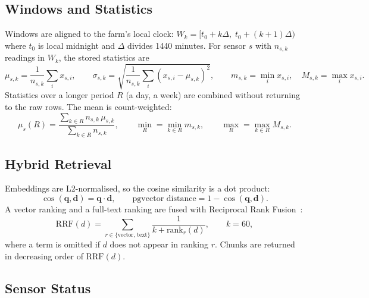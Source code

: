 \subsection{Windows and Statistics}

Windows are aligned to the farm's local clock: $W_k=[t_0+k\Delta,\;t_0+(k+1)\Delta)$ where $t_0$ is local midnight and $\Delta$ divides
1440 minutes. For sensor $s$ with $n_{s,k}$ readings in $W_k$, the stored statistics are
\begin{equation}
\mu_{s,k}=\frac{1}{n_{s,k}}\sum_i x_{s,i},\qquad
\sigma_{s,k}=\sqrt{\frac{1}{n_{s,k}}\sum_i \left(x_{s,i}-\mu_{s,k}\right)^2},\qquad
m_{s,k}=\min_i x_{s,i},\quad M_{s,k}=\max_i x_{s,i}.
\label{eq:window}
\end{equation}
Statistics over a longer period $R$ (a day, a week) are combined without returning to the raw rows. The mean is count-weighted:
\begin{equation}
\mu_s(R)=\frac{\sum_{k\in R} n_{s,k}\,\mu_{s,k}}{\sum_{k\in R} n_{s,k}},\qquad
\min_R=\min_{k\in R} m_{s,k},\qquad \max_R=\max_{k\in R} M_{s,k}.
\label{eq:combine}
\end{equation}

\subsection{Hybrid Retrieval}

Embeddings are L2-normalised, so the cosine similarity is a dot product:
\begin{equation}
\cos(\mathbf q,\mathbf d)=\mathbf q\cdot\mathbf d,\qquad \text{pgvector distance}=1-\cos(\mathbf q,\mathbf d).
\label{eq:cosine}
\end{equation}
A vector ranking and a full-text ranking are fused with Reciprocal Rank Fusion~\cite{cormack2009rrf}:
\begin{equation}
\mathrm{RRF}(d)=\sum_{r\in\{\text{vector},\,\text{text}\}}\frac{1}{k+\mathrm{rank}_r(d)},\qquad k=60,
\label{eq:rrf}
\end{equation}
where a term is omitted if $d$ does not appear in ranking $r$. Chunks are returned in decreasing order of $\mathrm{RRF}(d)$.

\subsection{Sensor Status}

